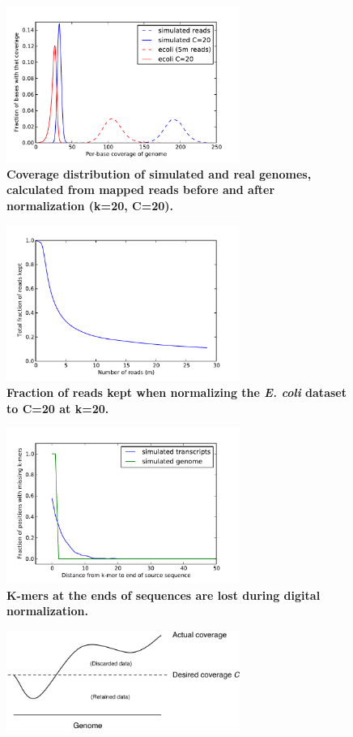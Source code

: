 \documentclass{pnastwo}
\begin{document}
\begin{figure}
\centerline{\includegraphics[width=3in]{diginorm-coverage.pdf}}
\caption{
{\bf Coverage distribution of simulated and real genomes, calculated from mapped reads before and after normalization (k=20, C=20).}}
\label{fig:coverage}
\end{figure}

\begin{figure}
\centerline{\includegraphics[width=3in]{diginorm-accumulation.pdf}}
\caption{
{\bf Fraction of reads kept when normalizing the {\em E. coli} dataset to C=20 at k=20.}}
\label{fig:accumulate}
\end{figure}

\begin{figure}
\centerline{\includegraphics[width=3in]{diginorm-endbias.pdf}}
\caption{
{\bf K-mers at the ends of sequences are lost during digital normalization.}}
\label{fig:endloss}
\end{figure}

\begin{figure}
\centerline{\includegraphics[width=3in]{schematic.pdf}}
\caption{}
\label{fig:schematic}
\end{figure}
\end{document}
